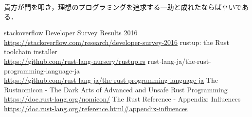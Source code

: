 貴方が門を叩き，理想のプログラミングを追求する一助と成れたならば幸いである．

\begin{thebibliography}{9}
 stackoverflow Developer Survey Results 2016 \\
  \url{https://stackoverflow.com/research/developer-survey-2016}
 rustup: the Rust toolchain installer \\
  \url{https://github.com/rust-lang-nursery/rustup.rs}
 rust-lang-ja/the-rust-programming-language-ja \\
  \url{https://github.com/rust-lang-ja/the-rust-programming-language-ja}
 The Rustnomicon - The Dark Arts of Advanced and Unsafe Rust Programming \\
  \url{https://doc.rust-lang.org/nomicon/}
 The Rust Reference - Appendix: Influences \\
  \url{https://doc.rust-lang.org/reference.html#appendix-influences}
\end{thebibliography}
